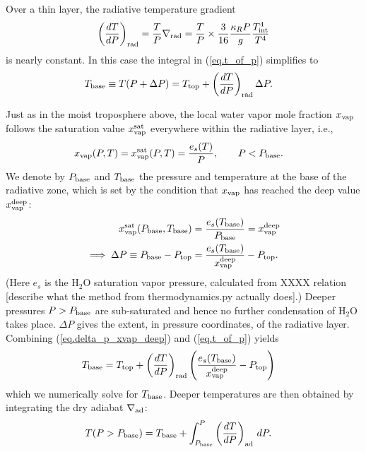\documentclass[12pt]{article}
\begin{document}
Over a thin layer, the radiative temperature gradient
\begin{align}
  \left(\frac{dT}{dP}\right)_{\rm rad}=\frac{T}{P}\nabla_{\rm rad}
  = \frac{T}{P}\times\frac{3}{16}\frac{\kappa_R P}{g}\frac{T_{\rm int}^4}{T^4}
\end{align}
is nearly constant. In this case the integral in (\ref{eq.t_of_p}) simplifies to
\begin{align}
T_{\rm base}\equiv T(P+\Delta P) &= T_{\rm top} + \left(\frac{dT}{dP}\right)_{\rm rad}\Delta P.\label{eq.t1}
\end{align}

Just as in the moist troposphere above, the local water vapor mole fraction $x_{\rm vap}$ follows the saturation value $x_{\rm vap}^{\rm sat}$ everywhere within the radiative layer, i.e.,
\begin{align}
x_{\rm vap}(P, T) &= x_{\rm vap}^{\rm sat}(P, T) = \frac{e_s(T)}{P}, \qquad P<P_{\rm base}.
\end{align}
We denote by $P_{\rm base}$ and $T_{\rm base}$ the pressure and temperature at the base of the radiative zone, which is set by the condition that $x_{\rm vap}$ has reached the deep value $x_{\rm vap}^{\rm deep}$:
\begin{align}
x_{\rm vap}^{\rm sat}(P_{\rm base}, T_{\rm base}) &= \frac{e_s(T_{\rm base})}{P_{\rm base}}=x_{\rm vap}^{\rm deep} \\
\implies \Delta P \equiv P_{\rm base}-P_{\rm top} &= \frac{e_s(T_{\rm base})}{x_{\rm vap}^{\rm deep}} - P_{\rm top}.\label{eq.delta_p_xvap_deep}
\end{align}
(Here $e_s$ is the H$_2$O saturation vapor pressure, calculated from XXXX relation [describe what the method from thermodynamics.py actually does].)
Deeper pressures $P>P_{\rm base}$ are sub-saturated and hence no further condensation of H$_2$O takes place.
$\Delta P$ gives the extent, in pressure coordinates, of the radiative layer. Combining (\ref{eq.delta_p_xvap_deep}) and (\ref{eq.t_of_p}) yields  
\begin{align}
T_{\rm base} &= T_{\rm top} + \left(\frac{dT}{dP}\right)_{\rm rad}\left(\frac{e_s(T_{\rm base})}{x_{\rm vap}^{\rm deep}} - P_{\rm top}\right)
\end{align}
which we numerically solve for $T_{\rm base}$. Deeper temperatures are then obtained by integrating the dry adiabat $\nabla_{\rm ad}$:
\begin{align}
T(P>P_{\rm base}) &= T_{\rm base} + \int_{P_{\rm base}}^P\left(\frac{dT}{dP}\right)_{\rm ad}\,d P. \label{eq.t_of_p_deep_dry}
\end{align}
\end{document}
